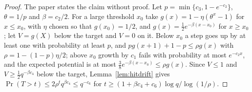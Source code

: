 \begin{proof}\leanok
The paper states the claim without proof. Let $p=\min\{c_3,1-e^{-c_2}\}$, $\theta=1/p$ and
$\beta=c_2/2$. For a large threshold $x_0$ take
$g(x)=1-\eta(\theta^x-1)$ for $x\le x_0$, with $\eta$ chosen so that
$g(x_0)=1/2$, and $g(x)=\tfrac12e^{-\beta(x-x_0)}$ for $x\ge x_0$; let
$V=g(X)$ below the target and $V=0$ on it. Below $x_0$ a step goes up by at
least one with probability at least $p$, and
$pg(x+1)+1-p\le\rho g(x)$ with $\rho=1-(1-p)\eta/2$; above $x_0$ growth by
$c_1$ fails with probability at most $e^{-c_2x}$, and the expected potential is
at most $\tfrac38e^{-\beta(x-x_0)}\le\rho g(x)$. Since $V\le1$ and
$V\ge\tfrac12q^{-\beta c_4}$ below the target, Lemma~\ref{lem:hitdrift} gives
$\Pr(T>t)\le2\rho^tq^{\beta c_4}\le q^{-c_6}$ for
$t\ge(1+\beta c_4+c_6)\log q/\log(1/\rho)$.
\end{proof}

